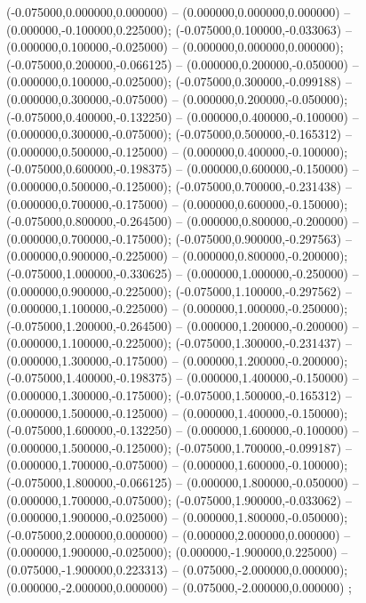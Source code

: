  (-0.075000,0.000000,0.000000) -- (0.000000,0.000000,0.000000) -- (0.000000,-0.100000,0.225000);
 (-0.075000,0.100000,-0.033063) -- (0.000000,0.100000,-0.025000) -- (0.000000,0.000000,0.000000);
 (-0.075000,0.200000,-0.066125) -- (0.000000,0.200000,-0.050000) -- (0.000000,0.100000,-0.025000);
 (-0.075000,0.300000,-0.099188) -- (0.000000,0.300000,-0.075000) -- (0.000000,0.200000,-0.050000);
 (-0.075000,0.400000,-0.132250) -- (0.000000,0.400000,-0.100000) -- (0.000000,0.300000,-0.075000);
 (-0.075000,0.500000,-0.165312) -- (0.000000,0.500000,-0.125000) -- (0.000000,0.400000,-0.100000);
 (-0.075000,0.600000,-0.198375) -- (0.000000,0.600000,-0.150000) -- (0.000000,0.500000,-0.125000);
 (-0.075000,0.700000,-0.231438) -- (0.000000,0.700000,-0.175000) -- (0.000000,0.600000,-0.150000);
 (-0.075000,0.800000,-0.264500) -- (0.000000,0.800000,-0.200000) -- (0.000000,0.700000,-0.175000);
 (-0.075000,0.900000,-0.297563) -- (0.000000,0.900000,-0.225000) -- (0.000000,0.800000,-0.200000);
 (-0.075000,1.000000,-0.330625) -- (0.000000,1.000000,-0.250000) -- (0.000000,0.900000,-0.225000);
 (-0.075000,1.100000,-0.297562) -- (0.000000,1.100000,-0.225000) -- (0.000000,1.000000,-0.250000);
 (-0.075000,1.200000,-0.264500) -- (0.000000,1.200000,-0.200000) -- (0.000000,1.100000,-0.225000);
 (-0.075000,1.300000,-0.231437) -- (0.000000,1.300000,-0.175000) -- (0.000000,1.200000,-0.200000);
 (-0.075000,1.400000,-0.198375) -- (0.000000,1.400000,-0.150000) -- (0.000000,1.300000,-0.175000);
 (-0.075000,1.500000,-0.165312) -- (0.000000,1.500000,-0.125000) -- (0.000000,1.400000,-0.150000);
 (-0.075000,1.600000,-0.132250) -- (0.000000,1.600000,-0.100000) -- (0.000000,1.500000,-0.125000);
 (-0.075000,1.700000,-0.099187) -- (0.000000,1.700000,-0.075000) -- (0.000000,1.600000,-0.100000);
 (-0.075000,1.800000,-0.066125) -- (0.000000,1.800000,-0.050000) -- (0.000000,1.700000,-0.075000);
 (-0.075000,1.900000,-0.033062) -- (0.000000,1.900000,-0.025000) -- (0.000000,1.800000,-0.050000);
 (-0.075000,2.000000,0.000000) -- (0.000000,2.000000,0.000000) -- (0.000000,1.900000,-0.025000);
 (0.000000,-1.900000,0.225000) -- (0.075000,-1.900000,0.223313) -- (0.075000,-2.000000,0.000000);
 (0.000000,-2.000000,0.000000) -- (0.075000,-2.000000,0.000000) ;
